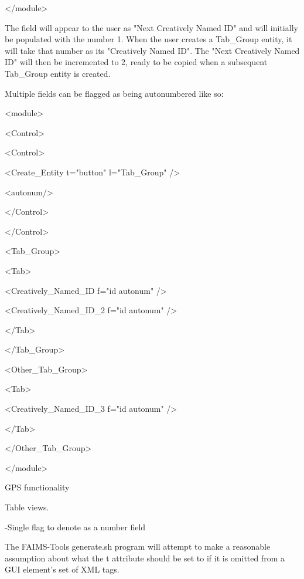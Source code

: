 </module>

The field will appear to the user as "Next Creatively Named ID" and will initially be populated with the number 1. When the user creates a Tab_Group entity, it will take that number as its "Creatively Named ID". The "Next Creatively Named ID" will then be incremented to 2, ready to be copied when a subsequent Tab_Group entity is created.

Multiple fields can be flagged as being autonumbered like so:

<module>

<Control>

<Control>

<Create_Entity t="button" l="Tab_Group" />

<autonum/>

</Control>

</Control>

<Tab_Group>

<Tab>

<Creatively_Named_ID f="id autonum" />

<Creatively_Named_ID_2 f="id autonum" />

</Tab>

</Tab_Group>

<Other_Tab_Group>

<Tab>

<Creatively_Named_ID_3 f="id autonum" />

</Tab>

</Other_Tab_Group>

</module>


GPS functionality


Table views.



-Single flag to denote as a number field


The FAIMS-Tools generate.sh program will attempt to make a reasonable assumption about what the t attribute should be set to if it is omitted from a GUI element's set of XML tags.

